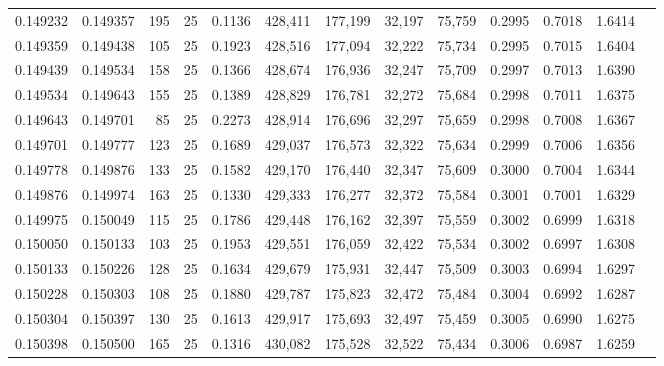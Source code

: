 \begin{tabular}{rrrrrrrrrrrrr}
0.149232 & 0.149357 &   195 &  25 &                                     0.1136 & 428,411 & 177,199 &  32,197 &  75,759 & 0.2995 & 0.7018 & 1.6414 \\
0.149359 & 0.149438 &   105 &  25 &                                     0.1923 & 428,516 & 177,094 &  32,222 &  75,734 & 0.2995 & 0.7015 & 1.6404 \\
0.149439 & 0.149534 &   158 &  25 &                                     0.1366 & 428,674 & 176,936 &  32,247 &  75,709 & 0.2997 & 0.7013 & 1.6390 \\
0.149534 & 0.149643 &   155 &  25 &                                     0.1389 & 428,829 & 176,781 &  32,272 &  75,684 & 0.2998 & 0.7011 & 1.6375 \\
0.149643 & 0.149701 &    85 &  25 &                                     0.2273 & 428,914 & 176,696 &  32,297 &  75,659 & 0.2998 & 0.7008 & 1.6367 \\
0.149701 & 0.149777 &   123 &  25 &                                     0.1689 & 429,037 & 176,573 &  32,322 &  75,634 & 0.2999 & 0.7006 & 1.6356 \\
0.149778 & 0.149876 &   133 &  25 &                                     0.1582 & 429,170 & 176,440 &  32,347 &  75,609 & 0.3000 & 0.7004 & 1.6344 \\
0.149876 & 0.149974 &   163 &  25 &                                     0.1330 & 429,333 & 176,277 &  32,372 &  75,584 & 0.3001 & 0.7001 & 1.6329 \\
0.149975 & 0.150049 &   115 &  25 &                                     0.1786 & 429,448 & 176,162 &  32,397 &  75,559 & 0.3002 & 0.6999 & 1.6318 \\
0.150050 & 0.150133 &   103 &  25 &                                     0.1953 & 429,551 & 176,059 &  32,422 &  75,534 & 0.3002 & 0.6997 & 1.6308 \\
0.150133 & 0.150226 &   128 &  25 &                                     0.1634 & 429,679 & 175,931 &  32,447 &  75,509 & 0.3003 & 0.6994 & 1.6297 \\
0.150228 & 0.150303 &   108 &  25 &                                     0.1880 & 429,787 & 175,823 &  32,472 &  75,484 & 0.3004 & 0.6992 & 1.6287 \\
0.150304 & 0.150397 &   130 &  25 &                                     0.1613 & 429,917 & 175,693 &  32,497 &  75,459 & 0.3005 & 0.6990 & 1.6275 \\
0.150398 & 0.150500 &   165 &  25 &                                     0.1316 & 430,082 & 175,528 &  32,522 &  75,434 & 0.3006 & 0.6987 & 1.6259 \\

\end{tabular}
